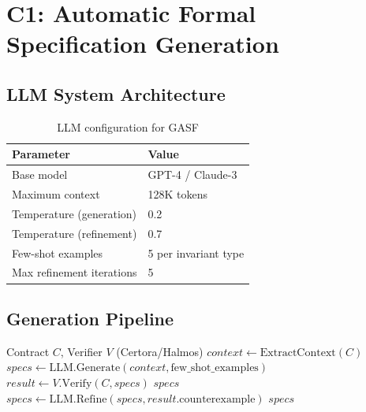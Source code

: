 \documentclass[11pt]{article}
\theoremstyle{definition}
\theoremstyle{plain}
\theoremstyle{remark}
\begin{document}
\section{C1: Automatic Formal Specification Generation}
\label{sec:gasf}

\subsection{LLM System Architecture}

\begin{table}[H]
\centering
\caption{LLM configuration for GASF}
\label{tab:llm_config}
\begin{tabular}{ll}
\toprule
\textbf{Parameter} & \textbf{Value} \\
\midrule
Base model & GPT-4 / Claude-3 \\
Maximum context & 128K tokens \\
Temperature (generation) & 0.2 \\
Temperature (refinement) & 0.7 \\
Few-shot examples & 5 per invariant type \\
Max refinement iterations & 5 \\
\bottomrule
\end{tabular}
\end{table}

\subsection{Generation Pipeline}

\begin{algorithm}[H]
\caption{GASF: Specification Generation}
\label{alg:gasf}
\begin{algorithmic}[1]
\Require Contract $C$, Verifier $V$ (Certora/Halmos)
\State $context \gets \text{ExtractContext}(C)$ 
\State $specs \gets \text{LLM.Generate}(context, \text{few\_shot\_examples})$
    \State $result \gets V.\text{Verify}(C, specs)$
        \State \Return $specs$
    \Else
        \State $specs \gets \text{LLM.Refine}(specs, result.\text{counterexample})$
    \EndIf
\EndFor
\State \Return $specs$ 
\end{algorithmic}
\end{algorithm}
\end{document}
